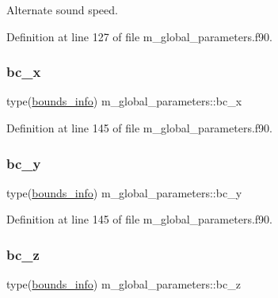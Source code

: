 Alternate sound speed. 



Definition at line 127 of file m\+\_\+global\+\_\+parameters.\+f90.

\mbox{\label{namespacem__global__parameters_aa46a7f3638e49fa9ec33ea859b9e6a5a}} 
\subsubsection{\texorpdfstring{bc\+\_\+x}{bc\_x}}
{\footnotesize\ttfamily type(\hyperlink{structm__derived__types_1_1bounds__info}{bounds\+\_\+info}) m\+\_\+global\+\_\+parameters\+::bc\+\_\+x}



Definition at line 145 of file m\+\_\+global\+\_\+parameters.\+f90.

\mbox{\label{namespacem__global__parameters_a68eaaca2982b39252417b29ef5d0f9c3}} 
\subsubsection{\texorpdfstring{bc\+\_\+y}{bc\_y}}
{\footnotesize\ttfamily type(\hyperlink{structm__derived__types_1_1bounds__info}{bounds\+\_\+info}) m\+\_\+global\+\_\+parameters\+::bc\+\_\+y}



Definition at line 145 of file m\+\_\+global\+\_\+parameters.\+f90.

\mbox{\label{namespacem__global__parameters_a6769808569174ff0eef096e958889837}} 
\subsubsection{\texorpdfstring{bc\+\_\+z}{bc\_z}}
{\footnotesize\ttfamily type(\hyperlink{structm__derived__types_1_1bounds__info}{bounds\+\_\+info}) m\+\_\+global\+\_\+parameters\+::bc\+\_\+z}



